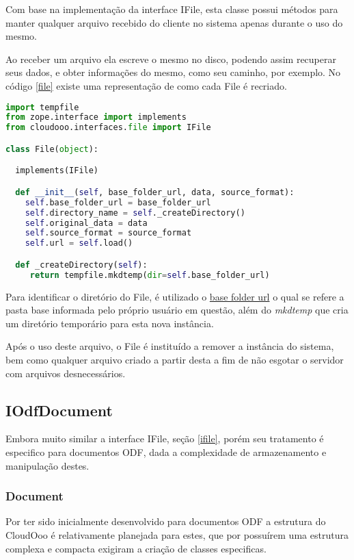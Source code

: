 Com base na implementação da interface IFile, esta classe possui métodos para manter qualquer arquivo recebido do cliente no sistema apenas durante o uso do mesmo.

Ao receber um arquivo ela escreve o mesmo no disco, podendo assim recuperar seus dados, e obter informações do mesmo, como seu caminho, por exemplo. No código \ref{file} existe uma representação de como cada File é recriado.

{\singlespace
\begin{lstlisting}[caption=Trecho de criação da classe File,language=python,label={file}]
import tempfile
from zope.interface import implements
from cloudooo.interfaces.file import IFile

class File(object):

  implements(IFile)

  def __init__(self, base_folder_url, data, source_format):
    self.base_folder_url = base_folder_url
    self.directory_name = self._createDirectory()
    self.original_data = data
    self.source_format = source_format
    self.url = self.load()

  def _createDirectory(self):
     return tempfile.mkdtemp(dir=self.base_folder_url)
\end{lstlisting}
}

Para identificar o diretório do File, é utilizado o \underline{base folder url} o qual se refere a pasta base informada pelo próprio usuário em questão, além do \textit{mkdtemp} que cria um diretório temporário para esta nova instância. 

Após o uso deste arquivo, o File é instituído a remover a instância do sistema, bem como qualquer arquivo criado a partir desta a fim de não esgotar o servidor com arquivos desnecessários.


\subsection{IOdfDocument}

Embora muito similar a interface IFile, seção \ref{ifile}, porém seu tratamento é especifico para documentos ODF, dada a complexidade de armazenamento e manipulação destes.

\subsubsection{Document}

Por ter sido inicialmente desenvolvido para documentos ODF a estrutura do CloudOoo é relativamente planejada para estes, que por possuírem uma estrutura complexa e compacta exigiram a criação de classes especificas. 

